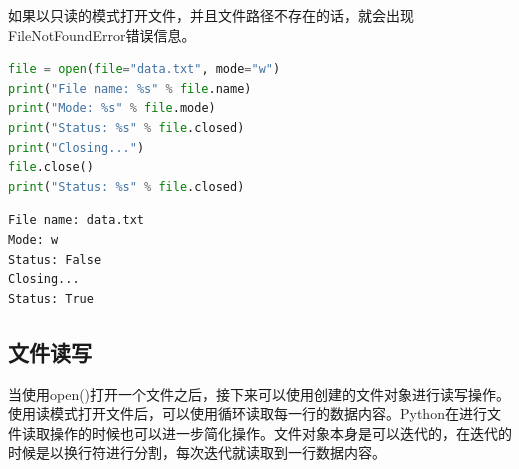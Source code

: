 如果以只读的模式打开文件，并且文件路径不存在的话，就会出现FileNotFoundError错误信息。\\


\begin{lstlisting}[language=Python]
file = open(file="data.txt", mode="w")
print("File name: %s" % file.name)
print("Mode: %s" % file.mode)
print("Status: %s" % file.closed)
print("Closing...")
file.close()
print("Status: %s" % file.closed)
\end{lstlisting}

\begin{tcolorbox}
	\begin{verbatim}
File name: data.txt
Mode: w
Status: False
Closing...
Status: True
	\end{verbatim}
\end{tcolorbox}

\vspace{0.5cm}

\subsection{文件读写}

当使用open()打开一个文件之后，接下来可以使用创建的文件对象进行读写操作。\\

使用读模式打开文件后，可以使用循环读取每一行的数据内容。Python在进行文件读取操作的时候也可以进一步简化操作。文件对象本身是可以迭代的，在迭代的时候是以换行符进行分割，每次迭代就读取到一行数据内容。

\begin{table}[H]
	\centering
	\caption{文件读写方法}
\end{table}

